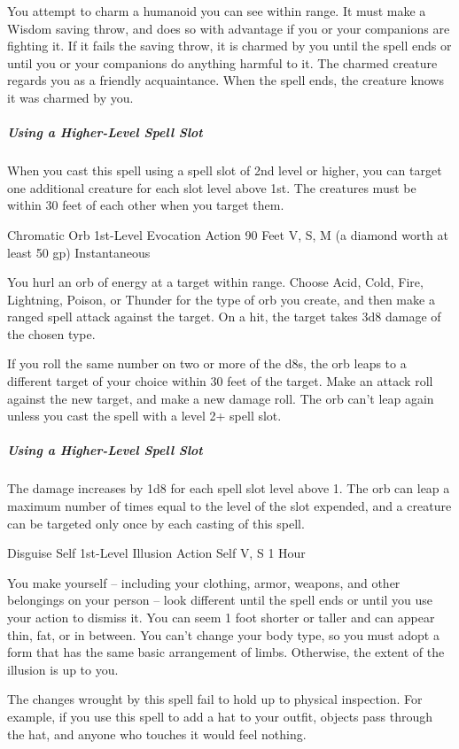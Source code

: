 \documentclass[letterpaper,openany,oneside,twocolumn]{book}
\begin{document}
You attempt to charm a humanoid you can see within range. It must make a Wisdom saving throw, and does so with advantage if you or your companions are fighting it. If it fails the saving throw, it is charmed by you until the spell ends or until you or your companions do anything harmful to it. The charmed creature regards you as a friendly acquaintance. When the spell ends, the creature knows it was charmed by you.

\subparagraph*{Using a Higher-Level Spell Slot} When you cast this spell using a spell slot of 2nd level or higher, you can target one additional creature for each slot level above 1st. The creatures must be within 30 feet of each other when you target them.

\DndSpellHeader
  {Chromatic Orb}
  {1st-Level Evocation}
  {Action}
  {90 Feet}
  {V, S, M (a diamond worth at least 50 gp)}
  {Instantaneous}

You hurl an orb of energy at a target within range. Choose Acid, Cold, Fire, Lightning, Poison, or Thunder for the type of orb you create, and then make a ranged spell attack against the target. On a hit, the target takes 3d8 damage of the chosen type.

If you roll the same number on two or more of the d8s, the orb leaps to a different target of your choice within 30 feet of the target. Make an attack roll against the new target, and make a new damage roll. The orb can't leap again unless you cast the spell with a level 2+ spell slot.

\subparagraph*{Using a Higher-Level Spell Slot} The damage increases by 1d8 for each spell slot level above 1. The orb can leap a maximum number of times equal to the level of the slot expended, and a creature can be targeted only once by each casting of this spell.

\DndSpellHeader
  {Disguise Self}
  {1st-Level Illusion}
  {Action}
  {Self}
  {V, S}
  {1 Hour}

You make yourself – including your clothing, armor, weapons, and other belongings on your person – look different until the spell ends or until you use your action to dismiss it. You can seem 1 foot shorter or taller and can appear thin, fat, or in between. You can't change your body type, so you must adopt a form that has the same basic arrangement of limbs. Otherwise, the extent of the illusion is up to you.

The changes wrought by this spell fail to hold up to physical inspection. For example, if you use this spell to add a hat to your outfit, objects pass through the hat, and anyone who touches it would feel nothing.
\end{document}
